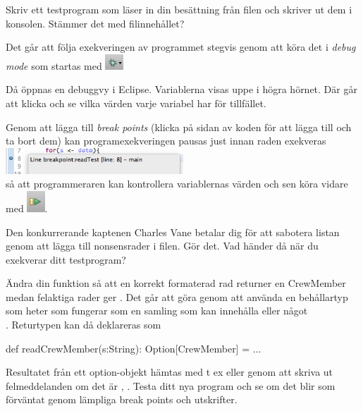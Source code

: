 \Subtask Skriv ett testprogram som läser in din besättning från filen och skriver ut dem i konsolen. Stämmer det med filinnehållet?

\Subtask Det går att följa exekveringen av programmet stegvis genom att köra det i \emph{debug mode} som startas med 
\includegraphics[width=0.05\textwidth]{../img/pirates/bug.png}

Då öppnas en debuggvy i Eclipse. Variablerna visas uppe i högra hörnet. Där går att klicka och se vilka värden varje variabel har för tillfället. 

Genom att lägga till \emph{break points} (klicka på sidan av koden för att lägga till och ta bort dem) kan programexekveringen pausas just innan raden exekveras  \\
\includegraphics[width=0.5\textwidth]{../img/pirates/breakpoint.png} \\
så att programmeraren kan kontrollera variablernas värden och sen köra vidare med \includegraphics[width=0.05\textwidth]{../img/pirates/next.png}.

\Subtask Den konkurrerande kaptenen Charles Vane betalar dig för att sabotera listan genom att lägga till nonsensrader i filen. Gör det. Vad händer då när du exekverar ditt testprogram?

\Subtask Ändra din funktion  så att en korrekt formaterad rad returner en CrewMember medan felaktiga rader ger . Det går att göra genom att använda en behållartyp som heter  som fungerar som en samling som kan innehålla  eller något \\ . Returtypen kan då deklareras som
\begin{Code}
def readCrewMember(s:String): Option[CrewMember] = ...
\end{Code}
Resultatet från ett option-objekt  hämtas med t ex  eller genom att skriva ut felmeddelanden om det är , . Testa ditt nya program och se om det blir som förväntat genom lämpliga break points och utskrifter. 

